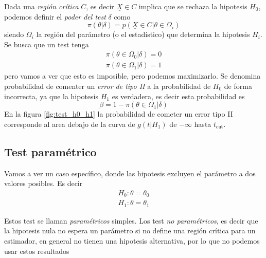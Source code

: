 \documentclass{article}
\numberwithin{equation}{section} %
\begin{document}
Dada una \emph{región crítica} $C$, es decir $\underline{X} \in C$ implica que se rechaza la hipotesis $H_0$, podemos definir el \emph{poder del test} $\delta$ como
\begin{equation}
\pi(\theta|\delta) = p(\underline{X} \in C | \theta \in \Omega_i)
\end{equation}
siendo $\Omega_i$ la región del parámetro (o el estadístico) que determina la hipotesis $H_i$. Se busca que un test tenga
\begin{equation}
\begin{gathered}
\pi(\theta \in \Omega_0 |\delta) = 0 \\
\pi(\theta \in \Omega_1 | \delta ) = 1
\end{gathered}
\end{equation}
pero vamos a ver que esto es imposible, pero podemos maximizarlo. Se denomina probabilidad de comenter un \emph{error de tipo II} a la probabilidad de $H_0$ de forma incorrecta, ya que la hipotesis $H_1$ es verdadera, es decir esta probabilidad es
\begin{equation}
\beta = 1 - \pi(\theta \in \Omega_1 | \delta)
\end{equation}
En la figura \ref{fig:test_h0_h1} la probabilidad de cometer un error tipo II corresponde al area debajo de la curva de $g(t|H_1)$ de $-\infty$ hasta $t_{\text{cut}}$. 
\subsection{Test paramétrico}
Vamos a ver un caso específico, donde las hipotesis excluyen el parámetro a dos valores posibles. Es decir
\begin{equation}
\begin{gathered}
H_0 : \theta = \theta_0\\
H_1 : \theta = \theta_1
\end{gathered}
\end{equation}

Estos test se llaman \emph{paramétricos} simples. Los test \emph{no paramétricos}, es decir que la hipotesis nula no espera un parámetro si no define una región crítica para un estimador, en general no tienen una hipotesis alternativa, por lo que no podemos usar estos resultados
\end{document}
